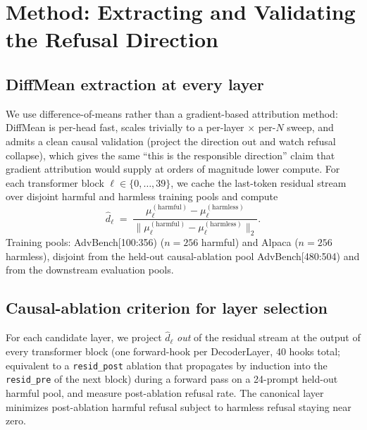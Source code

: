 \documentclass[10pt,twocolumn]{article}
\newcommand{\dhat}{\hat{d}}
\newcommand{\layerL}{\ell}
\newcommand{\Ncontext}{N}
\newcommand{\advbench}{AdvBench}
\newcommand{\alpaca}{Alpaca}
\theoremstyle{definition}
\begin{document}
\section{Method: Extracting and Validating the Refusal Direction}
\label{sec:method}

\subsection{DiffMean extraction at every layer}
\label{sec:method-dhat}

We use difference-of-means
\citep{arditi2024refusal} rather than a gradient-based attribution
method: DiffMean is per-head fast, scales trivially to a per-layer
$\times$ per-$\Ncontext$ sweep, and admits a clean causal validation
(project the direction out and watch refusal collapse), which gives
the same ``this is the responsible direction'' claim that gradient
attribution would supply at orders of magnitude lower compute.
For each transformer block $\layerL \in \{0, \ldots, 39\}$, we cache
the last-token residual stream over disjoint harmful and harmless
training pools and compute
\begin{equation}
  \dhat_\layerL \;=\;
  \frac{\mu^{(\mathrm{harmful})}_\layerL - \mu^{(\mathrm{harmless})}_\layerL}
       {\lVert \mu^{(\mathrm{harmful})}_\layerL
       - \mu^{(\mathrm{harmless})}_\layerL \rVert_2}.
\end{equation}
Training pools: \advbench{}[100:356) ($n{=}256$ harmful) and \alpaca{}
($n{=}256$ harmless), disjoint from the held-out causal-ablation pool
\advbench{}[480:504) and from the downstream evaluation pools.

\subsection{Causal-ablation criterion for layer selection}
\label{sec:layer-selection}

For each candidate layer, we project $\dhat_\layerL$ \emph{out} of the
residual stream at the output of every transformer block (one
forward-hook per DecoderLayer, 40 hooks total; equivalent to a
\texttt{resid\_post} ablation that propagates by induction into the
\texttt{resid\_pre} of the next block) during a forward pass on a
24-prompt held-out harmful pool, and measure post-ablation refusal
rate. The canonical layer
minimizes post-ablation harmful refusal subject to harmless refusal
staying near zero.
\end{document}
